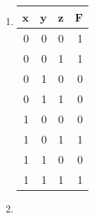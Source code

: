 \documentclass[11pt,fleqn]{article}
\begin{document}
\begin{enumerate}
\begin{enumerate}
\end{enumerate}

\item 
\begin{tabular}{|r|r|r|r|}
\hline
x & y & z & F\\
\hline 
0 & 0 & 0 & 1 \\
0 & 0 & 1 & 1 \\
0 & 1 & 0 & 0 \\
0 & 1 & 1 & 0 \\
1 & 0 & 0 & 0 \\
1 & 0 & 1 & 1 \\
1 & 1 & 0 & 0 \\
1 & 1 & 1 & 1 \\
\hline
\end{tabular}

\item
\end{enumerate}
\end{document}
